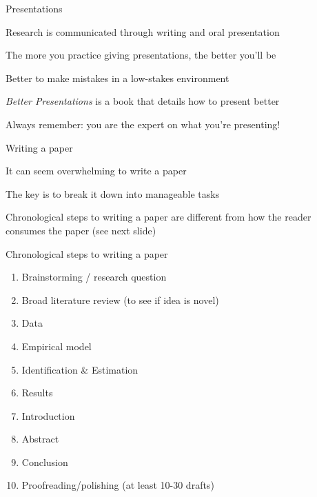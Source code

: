 \documentclass[notes,12pt, aspectratio=169]{beamer}
\newenvironment{wideitemize}{\itemize\addtolength{\itemsep}{15pt}}{\enditemize}
\begin{document}
\begin{frame}{Presentations}
\begin{wideitemize}
\item Research is communicated through writing and oral presentation
\item The more you practice giving presentations, the better you'll be
\item Better to make mistakes in a low-stakes environment
\item \textit{Better Presentations} is a book that details how to present better
\item Always remember: you are the expert on what you're presenting!
\end{wideitemize}
\end{frame}





\begin{frame}{Writing a paper}
\begin{wideitemize}
\item It can seem overwhelming to write a paper 
\item The key is to break it down into manageable tasks
\item Chronological steps to writing a paper are different from how the reader consumes the paper (see next slide)
\end{wideitemize}
\end{frame}





\begin{frame}{Chronological steps to writing a paper}
\begin{enumerate}
\item Brainstorming / research question
\item Broad literature review (to see if idea is novel)
\item Data
\item Empirical model
\item Identification \& Estimation
\item Results
\item Introduction
\item Abstract
\item Conclusion
\item Proofreading/polishing (at least 10-30 drafts)
\end{enumerate}
\end{frame}
\end{document}
